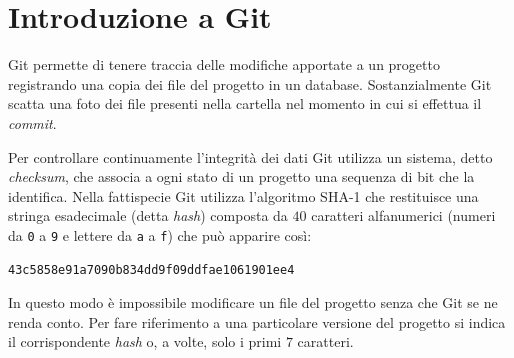 \documentclass[a4paper,12pt,oneside]{article}
\begin{document}
\section{Introduzione a Git}
Git permette di tenere traccia delle modifiche apportate a un progetto registrando
una copia dei file del progetto in un database. Sostanzialmente Git scatta una
foto dei file presenti nella cartella nel momento in cui si effettua il
\emph{commit}.

Per controllare continuamente l'integrità dei dati Git utilizza un sistema, detto
\emph{checksum}, che associa a ogni stato di un progetto una sequenza di bit che
la identifica. Nella fattispecie Git utilizza l'algoritmo SHA-1 che restituisce
una stringa esadecimale (detta \emph{hash}) composta da $40$ caratteri
alfanumerici (numeri da \lstinline|0| a \lstinline|9| e lettere da \lstinline|a|
a \lstinline|f|) che può apparire così:
\begin{lstlisting}
43c5858e91a7090b834dd9f09ddfae1061901ee4
\end{lstlisting}
In questo modo è impossibile modificare un file del progetto senza che Git se
ne renda conto. Per fare riferimento a una particolare versione del progetto
si indica il corrispondente \emph{hash} o, a volte, solo i primi $7$ caratteri.
\end{document}
